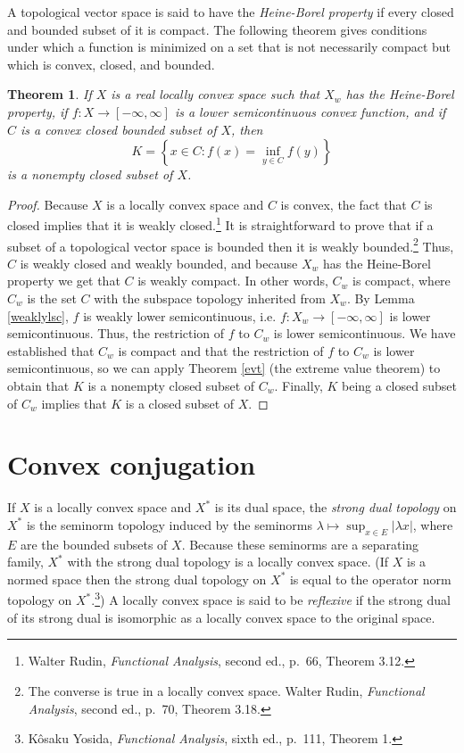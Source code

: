 \documentclass{article}
\newtheorem{theorem}{Theorem}
\theoremstyle{definition}
\begin{document}
A topological vector space is said to have the {\em Heine-Borel property} if every closed and bounded subset  of it is compact. 
The following theorem gives conditions under which a function is minimized on a set that is  not necessarily compact but which is convex, closed, and bounded.



\begin{theorem}
If $X$ is a real  locally convex space such that $X_w$ has the Heine-Borel property, if $f:X \to [-\infty,\infty]$ is a  lower semicontinuous   convex function, 
and if $C$ is a convex closed bounded  subset of $X$, then 
\[
K=\left\{ x \in C: f(x) = \inf_{y \in C} f(y) \right\}
\]
is a nonempty closed subset of $X$.
\end{theorem}
\begin{proof}
Because $X$ is a locally convex space and $C$ is convex, the fact that $C$ is closed implies that it is weakly closed.\footnote{Walter Rudin, {\em Functional Analysis}, second ed., p.~66, Theorem 3.12.}
It is straightforward to prove that if a subset of a topological vector space is bounded then it is weakly bounded.\footnote{The converse is true in a locally convex space. Walter
Rudin, {\em Functional Analysis}, second ed., p.~70, Theorem 3.18.} 
Thus, $C$ is weakly closed and weakly bounded, and because $X_w$ has the Heine-Borel property we get that $C$ is weakly compact.
In other words, $C_w$ is compact, where $C_w$ is the set $C$ with the subspace topology inherited from $X_w$.
By Lemma \ref{weaklylsc}, $f$ is weakly lower semicontinuous, i.e. $f:X_w \to [-\infty,\infty]$ is lower semicontinuous.
Thus, the restriction of $f$ to $C_w$  is lower semicontinuous.
We have established that $C_w$ is compact and that the restriction of $f$ to $C_w$ is lower semicontinuous, so we can 
apply
Theorem \ref{evt} (the extreme value theorem) to obtain that
$K$ is a nonempty closed subset of $C_w$. Finally,  $K$ being a closed subset of $C_w$ implies that $K$ is a closed subset of $X$.
\end{proof}



\section{Convex conjugation}
 If $X$ is a locally convex space and $X^*$ is its dual space, the {\em strong dual topology} on $X^*$ is the seminorm topology induced by
the seminorms $\lambda \mapsto \sup_{x \in E} |\lambda x|$, where $E$ are the bounded subsets of $X$. Because these seminorms are a separating family, $X^*$ with the strong dual topology
is a locally convex space.
(If $X$ is a normed space then the strong dual topology on $X^*$ is equal to the operator norm topology on $X^*$.\footnote{K\^osaku
Yosida, {\em Functional Analysis}, sixth ed., p.~111, Theorem 1.})
A locally convex space is said to be {\em reflexive} if the strong dual of its strong dual is isomorphic as a locally convex space to the original space.
\end{document}
